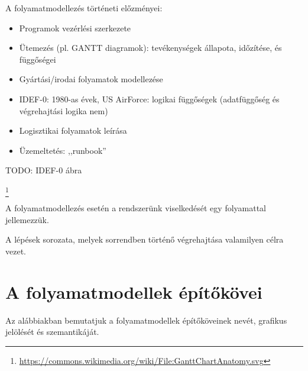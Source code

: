\begin{megjegyzes}
A folyamatmodellezés történeti előzményei:

\begin{itemize}
	\item Programok vezérlési szerkezete
	\item Ütemezés (pl. GANTT diagramok): tevékenységek állapota, időzítése, és függőségei
	\item Gyártási/irodai folyamatok modellezése
	\item IDEF-0: 1980-as évek, US AirForce: logikai függőségek (adatfüggőség és végrehajtási logika nem)
	\item Logisztikai folyamatok leírása
	\item Üzemeltetés: ,,runbook''
\end{itemize}

TODO: IDEF-0 ábra



\footnote{\url{https://commons.wikimedia.org/wiki/File:GanttChartAnatomy.svg}}
\end{megjegyzes}

A folyamatmodellezés esetén a rendszerünk viselkedését egy folyamattal jellemezzük.

\begin{definicio}
	A  lépések sorozata, melyek sorrendben történő végrehajtása valamilyen célra vezet.
\end{definicio}	

\section{A folyamatmodellek építőkövei}

Az alábbiakban bemutatjuk a folyamatmodellek építőköveinek nevét, grafikus jelölését és szemantikáját.

\begin{definicio}
	 
\end{definicio}




